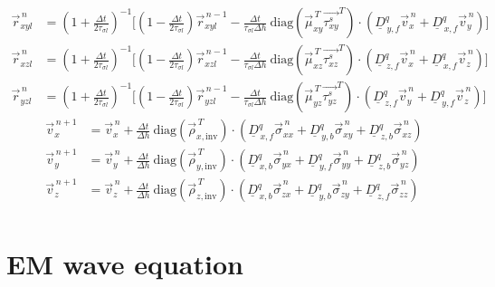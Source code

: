 \documentclass[pdftex,a4paper,parskip,listof=totoc,bibliography=totoc,onehalfspacing,12pt]{scrreprt}
\begin{document}
\begin{align*}
	\vec{r}_{xyl}^{\,n} &= \left( 1+\frac{\Delta t}{2 \tau_{\sigma l}} \right)^{-1} \Bigg[ \left( 1-\frac{\Delta t}{2 \tau_{\sigma l}} \right) \vec{r}_{xyl}^{\,n-1} - \frac{\Delta t}{\tau_{\sigma l} \Delta h} ~\mathrm{diag} \left( \vec{\mu}_{xy}^{\,T} \vec{\tau^s_{xy}}^{T} \right) \cdot \left( \underline{D}_{\,y,f}^q \vec{v}_x^{\,n} + \underline{D}_{\,x,f}^q \vec{v}_y^{\,n} \right) \Bigg]\\
	\vec{r}_{xzl}^{\,n} &= \left( 1+\frac{\Delta t}{2 \tau_{\sigma l}} \right)^{-1} \Bigg[ \left( 1-\frac{\Delta t}{2 \tau_{\sigma l}} \right) \vec{r}_{xzl}^{\,n-1} - \frac{\Delta t}{\tau_{\sigma l} \Delta h} ~\mathrm{diag} \left( \vec{\mu}_{xz}^{\,T} \vec{\tau_{xz}^s}^{T} \right) \cdot \left( \underline{D}_{\,z,f}^q \vec{v}_x^{\,n} + \underline{D}_{\,x,f}^q \vec{v}_z^{\,n} \right) \Bigg]\\
	\vec{r}_{yzl}^{\,n} &= \left( 1+\frac{\Delta t}{2 \tau_{\sigma l}} \right)^{-1} \Bigg[ \left( 1-\frac{\Delta t}{2 \tau_{\sigma l}} \right) \vec{r}_{yzl}^{\,n-1} - \frac{\Delta t}{\tau_{\sigma l} \Delta h} ~\mathrm{diag} \left( \vec{\mu}_{yz}^{\,T} \vec{\tau_{yz}^s}^{T} \right) \cdot \left( \underline{D}_{\,z,f}^q \vec{v}_y^{\,n} + \underline{D}_{\,y,f}^q \vec{v}_z^{\,n} \right) \Bigg]
\end{align*}
\begin{align*}
	\vec{v}_x^{\,n+1} &= \vec{v}_x^{\,n} + \frac{\Delta t}{\Delta h} ~ \mathrm{diag} \left( \vec{\rho}_{x,\mathrm{inv}}^{\,T} \right) \cdot \left( \underline{D}_{\,x,f}^q \vec{\sigma}_{xx}^{\,n} + \underline{D}_{\,y,b}^q \vec{\sigma}_{xy}^{\,n} + \underline{D}_{\,z,b}^q \vec{\sigma}_{xz}^{\,n} \right)\\
	\vec{v}_y^{\,n+1} &= \vec{v}_y^{\,n} + \frac{\Delta t}{\Delta h} ~ \mathrm{diag} \left( \vec{\rho}_{y,\mathrm{inv}}^{\,T} \right) \cdot \left( \underline{D}_{\,x,b}^q \vec{\sigma}_{yx}^{\,n} + \underline{D}_{\,y,f}^q \vec{\sigma}_{yy}^{\,n} + \underline{D}_{\,z,b}^q \vec{\sigma}_{yz}^{\,n} \right)\\
	\vec{v}_z^{\,n+1} &= \vec{v}_z^{\,n} + \frac{\Delta t}{\Delta h} ~ \mathrm{diag} \left( \vec{\rho}_{z,\mathrm{inv}}^{\,T} \right) \cdot \left( \underline{D}_{\,x,b}^q \vec{\sigma}_{zx}^{\,n} + \underline{D}_{\,y,b}^q \vec{\sigma}_{zy}^{\,n} + \underline{D}_{\,z,f}^q \vec{\sigma}_{zz}^{\,n} \right)\\
\end{align*}

\chapter{EM wave equation}
\label{sec:Visco_EM_wave_equation}
\end{document}
